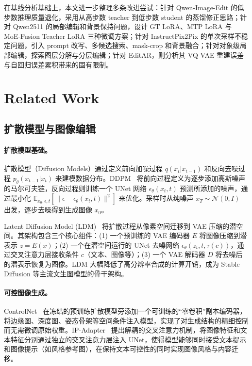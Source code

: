 \documentclass[UTF8,11pt,a4paper,fontset=fandol]{ctexart}
\begin{document}
在基线分析基础上，本文进一步整理多条改进尝试：针对 Qwen-Image-Edit 的低步数推理质量退化，采用从高步数 teacher 到低步数 student 的蒸馏修正思路；针对 Qwen2511 的局部编辑和背景保持问题，设计 GT LoRA、MTP LoRA 与 MoE-Fusion Teacher LoRA 三种微调方案；针对 InstructPix2Pix 的单次采样不稳定问题，引入 prompt 改写、多候选搜索、mask-crop 和背景融合；针对对象级局部编辑，探索图层分解与分层编辑；针对 EditAR，则分析其 VQ-VAE 重建误差与自回归误差累积带来的固有限制。

\section{Related Work}

\subsection{扩散模型与图像编辑}

\paragraph{扩散模型基础。}
扩散模型（Diffusion Models）通过定义前向加噪过程 $q(x_t|x_{t-1})$ 和反向去噪过程 $p_\theta(x_{t-1}|x_t)$ 来建模数据分布。DDPM~\cite{ddpm} 将前向过程定义为逐步添加高斯噪声的马尔可夫链，反向过程则训练一个 UNet 网络 $\epsilon_\theta(x_t,t)$ 预测所添加的噪声，通过最小化 $\mathbb{E}_{x_0,\epsilon,t}\left[\|\epsilon-\epsilon_\theta(x_t,t)\|^2\right]$ 来优化。采样时从纯噪声 $x_T\sim\mathcal{N}(0,I)$ 出发，逐步去噪得到生成图像 $x_0$。

Latent Diffusion Model (LDM)~\cite{ldm} 将扩散过程从像素空间迁移到 VAE 压缩的潜空间。其架构包含三个核心组件：(1) 一个预训练的 VAE 编码器 $E$ 将图像压缩到潜表示 $z=E(x)$；(2) 一个在潜空间运行的 UNet 去噪网络 $\epsilon_\theta(z_t,t,\tau(c))$，通过交叉注意力层接收条件 $c$（文本、图像等）；(3) 一个 VAE 解码器 $D$ 将去噪后的潜表示恢复为图像。LDM 大幅降低了高分辨率合成的计算开销，成为 Stable Diffusion 等主流文生图模型的骨干架构。

\paragraph{可控图像生成。}
ControlNet~\cite{controlnet} 在冻结的预训练扩散模型旁添加一个可训练的“零卷积”副本编码器，将边缘图、深度图、姿态骨架等空间条件注入模型，实现了对生成结构的精细控制而无需微调原始权重。IP-Adapter~\cite{ipadapter} 提出解耦的交叉注意力机制，将图像特征和文本特征分别通过独立的交叉注意力层注入 UNet，使得模型能够同时接受文本提示和图像提示（如风格参考图），在保持文本可控性的同时实现图像风格与内容迁移。
\end{document}
